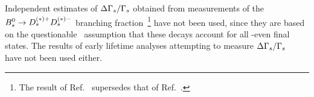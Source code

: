 Independent estimates of $\Delta\Gamma_{s}/\Gamma_{s}$ obtained from measurements of the 
$B^0_s \to D_s^{(*)+} D_s^{(*)-}$ branching fraction~\cite{Barate:2000kd,Esen:2010jq_mod,Abazov:2008ig,Abulencia:2007zz}\footnote{
  The result of Ref.~\cite{Abazov:2008ig} supersedes that of Ref.~\cite{Abazov:2007rb}.
}
have not been used,
since they are based on the questionable~\cite{Lenz:2011ti,*Lenz:2006hd}
assumption that these decays account for all \CP-even final states.
The results of early lifetime analyses attempting
to measure $\Delta\Gamma_{s}/\Gamma_{s}$~\cite{Acciarri:1998uv,Abreu:2000sh,Abreu:2000ev,Abe:1997bd}
have not been used either. 











